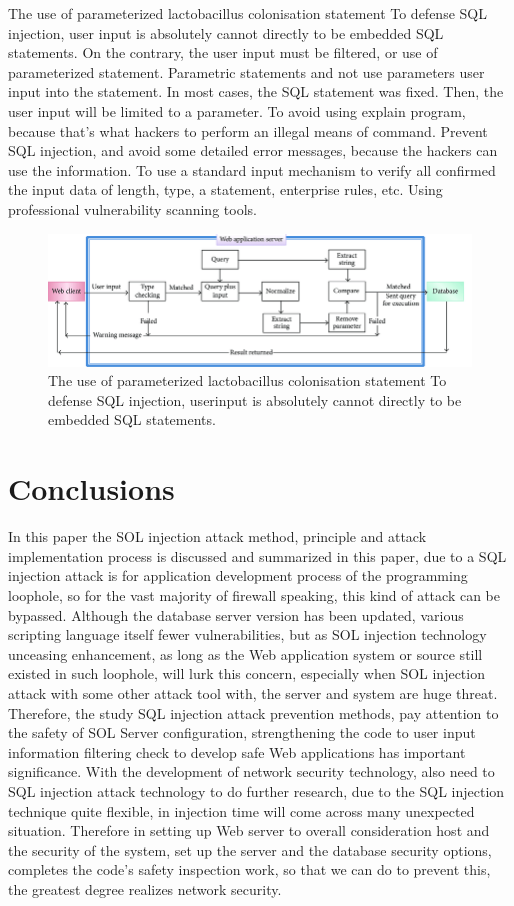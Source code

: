 \documentclass[letterpaper,12pt]{article}
\begin{document}
The use of parameterized lactobacillus colonisation statement
To defense SQL injection, user input is absolutely cannot directly to be embedded SQL statements.
On the contrary, the user input must be filtered, or use of parameterized statement. Parametric
statements and not use parameters user input into the statement. In most cases, the SQL statement was
fixed. Then, the user input will be limited to a parameter.
To avoid using explain program, because that's what hackers to perform an illegal means of
command.
Prevent SQL injection, and avoid some detailed error messages, because the hackers can use the
information. To use a standard input mechanism to verify all confirmed the input data of length, type, a
statement, enterprise rules, etc.
Using professional vulnerability scanning tools. 
\begin{figure}[!h]
    \centering
    \includegraphics[width=.8\textwidth]{Model-for-prevention-of-SQL-injection-attack.png}
    \caption{The use of parameterized lactobacillus colonisation statement To defense SQL injection, userinput is absolutely cannot directly to be embedded SQL statements.}
\end{figure}




\section{Conclusions}
In this paper the SOL injection attack method, principle and attack implementation process is
discussed and summarized in this paper, due to a SQL injection attack is for application development
process of the programming loophole, so for the vast majority of firewall speaking, this kind of attack
can be bypassed. Although the database server version has been updated, various scripting language
itself fewer vulnerabilities, but as SOL injection technology unceasing enhancement, as long as the
Web application system or source still existed in such loophole, will lurk this concern, especially when
SOL injection attack with some other attack tool with, the server and system are huge threat.
Therefore, the study SQL injection attack prevention methods, pay attention to the safety of SOL
Server configuration, strengthening the code to user input information filtering check to develop safe
Web applications has important significance. With the development of network security technology,
also need to SQL injection attack technology to do further research, due to the SQL injection technique
quite flexible, in injection time will come across many unexpected situation. Therefore in setting up
Web server to overall consideration host and the security of the system, set up the server and the
database security options, completes the code's safety inspection work, so that we can do to prevent this,
the greatest degree realizes network security. 
\end{document}
